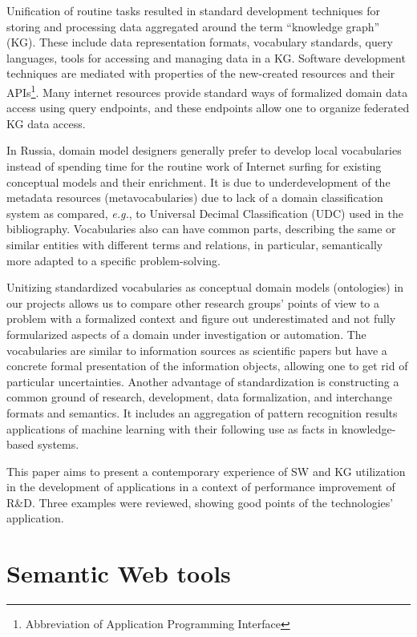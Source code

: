 \documentclass[a4paper]{jctart19a}
\begin{document}
Unification of routine tasks resulted in standard development techniques for storing and processing data aggregated around the term ``knowledge graph'' (KG).  These include data representation formats, vocabulary standards, query languages, tools for accessing and managing data in a KG.  Software development techniques are mediated with properties of the new-created resources and their APIs\footnote{Abbreviation of Application Programming Interface}.  Many internet resources provide standard ways of formalized domain data access using query endpoints, and these endpoints allow one to organize federated KG data access.

In Russia, domain model designers generally prefer to develop local vocabularies instead of spending time for the routine work of Internet surfing for existing conceptual models and their enrichment.  It is due to underdevelopment of the metadata resources (metavocabularies) due to lack of a domain classification system as compared, \emph{e.g.}, to Universal Decimal Classification (UDC) used in the bibliography.  Vocabularies also can have common parts, describing the same or similar entities with different terms and relations, in particular, semantically more adapted to a specific problem-solving.

Unitizing standardized vocabularies as conceptual domain models (ontologies) in our projects allows us to compare other research groups' points of view to a problem with a formalized context and figure out underestimated and not fully formularized aspects of a domain under investigation or automation.  The vocabularies are similar to information sources as scientific papers but have a concrete formal presentation of the information objects, allowing one to get rid of particular uncertainties.  Another advantage of standardization is constructing a common ground of research, development, data formalization, and interchange formats and semantics.  It includes an aggregation of pattern recognition results applications of machine learning with their following use as facts in knowledge-based systems.

This paper aims to present a contemporary experience of SW and KG utilization in the development of applications in a context of performance improvement of R\&D.  Three examples were reviewed, showing good points of the technologies' application.


\section{Semantic Web tools}
\label{sec:sw-tools}
\end{document}
